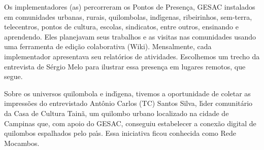 \documentclass[
12pt,		%
openright,	%
twoside,  %
a4paper,			%
chapter=TITLE,		%
english,			%
french,				%
spanish,			%
brazil				%
]{USPSC-classe/USPSC}
\begin{document}
Os implementadores (as) percorreram os Pontos de Presen\c{c}a, GESAC instalados em comunidades urbanas, rurais, quilombolas, ind\'{\i}genas, ribeirinhos, sem-terra, telecentros, pontos de cultura, escolas, sindicatos, entre outros, ensinando e aprendendo. Eles planejavam seus trabalhos e as visitas nas comunidades usando uma ferramenta de edi\c{c}\~ao colaborativa (Wiki). Mensalmente, cada implementador apresentava seu relat\'orios de atividades. Escolhemos um trecho da entrevista de S\'ergio Melo para ilustrar essa presen\c{c}a em lugares remotos, que segue.


















\noindent\begin{center}\mbox{\centering{}}\end{center}


Sobre os universos quilombola e ind\'{\i}gena, tivemos a oportunidade de coletar as impress\~oes do entrevistado Ant\^onio Carlos (TC) Santos Silva, l\'{\i}der comunit\'ario da Casa de Cultura Tain\~a, um quilombo urbano localizado na cidade de Campinas que, com apoio do GESAC, conseguiu estabelecer a conex\~ao digital de quilombos espalhados pelo pa\'{\i}s. Essa iniciativa ficou conhecida como Rede Mocambos.
\end{document}
